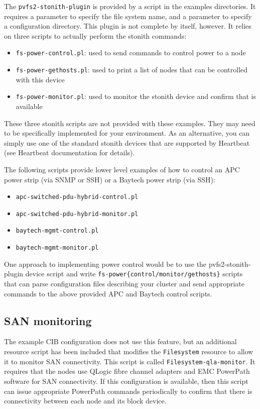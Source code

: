\documentclass[11pt]{article}
\begin{document}
The \texttt{pvfs2-stonith-plugin} is provided by a script in the
examples directories.  It requires a parameter to specify the file
system name, and a parameter to specify a configuration directory.  This
plugin is not complete by itself, however.  It relies on three scripts
to actually perform the stonith commands:
\begin{itemize}
\item \texttt{fs-power-control.pl}: used to send commands to control power to a
node
\item \texttt{fs-power-gethosts.pl}: used to print a list of nodes that can be
controlled with this device
\item \texttt{fs-power-monitor.pl}: used to monitor the stonith device and
confirm that is available
\end{itemize}

These three stonith scripts are not provided with these examples.  They
may need to be specifically implemented for your environment.  As an alternative,
you can simply use one of the standard stonith devices that are
supported by Heartbeat (see Heartbeat documentation for details).

The following scripts provide lower level examples of how to control an APC power
strip (via SNMP or SSH) or a Baytech power strip (via SSH):
\begin{itemize}
\item \texttt{apc-switched-pdu-hybrid-control.pl}
\item \texttt{apc-switched-pdu-hybrid-monitor.pl}
\item \texttt{baytech-mgmt-control.pl}
\item \texttt{baytech-mgmt-monitor.pl}
\end{itemize}

One approach to implementing power control would be to use the
pvfs2-stonith-plugin device script and write
\texttt{fs-power\{control/monitor/gethosts\}} scripts that can parse
configuration files describing your cluster and send appropriate
commands to the above provided APC and Baytech control scripts.

\subsection{SAN monitoring}

The example CIB configuration does not use this feature, but an
additional resource script has been included that modifies the
\texttt{Filesystem} resource to allow it to monitor SAN connectivity.  This
script is called \texttt{Filesystem-qla-monitor}.  It requires that the
nodes use QLogic fibre channel adapters and EMC PowerPath
software for SAN connectivity.  If this configuration is available, then this script can
issue appropriate PowerPath commands periodically to confirm that there
is connectivity between each node and its block device.
\end{document}
